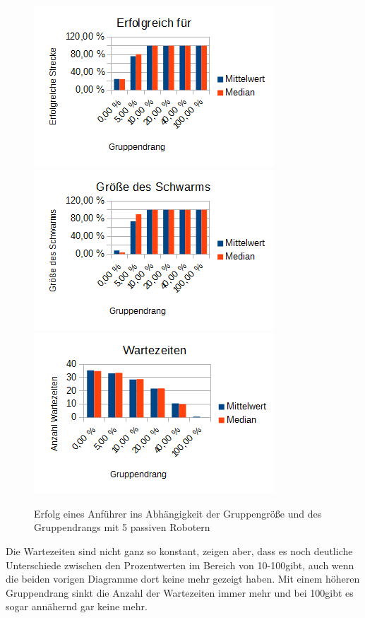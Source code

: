 \begin{figure}[h]
	\includegraphics[width=\sectionLeaderPictureWidth , height=\sectionLeaderPictureHeight]{graphics/Statistics/Leader/FlockSize/5_1.png}
	\includegraphics[width=\sectionLeaderPictureWidth , height=\sectionLeaderPictureHeight]{graphics/Statistics/Leader/FlockSize/5_2.png}
	\includegraphics[width=\sectionLeaderPictureWidth , height=\sectionLeaderPictureHeight]{graphics/Statistics/Leader/FlockSize/5_3.png}
	\caption{Erfolg eines Anführer ins Abhängigkeit der Gruppengröße und des Gruppendrangs mit 5 passiven Robotern}
	\label{pic:LeaderSize5}
\end{figure}

Die Wartezeiten sind nicht ganz so konstant, zeigen aber, dass es noch deutliche Unterschiede zwischen den Prozentwerten im Bereich von 10-100\per gibt, auch wenn die beiden vorigen Diagramme dort keine mehr gezeigt haben. Mit einem höheren Gruppendrang sinkt die Anzahl der Wartezeiten immer mehr und bei 100\per gibt es sogar annähernd gar keine mehr.

